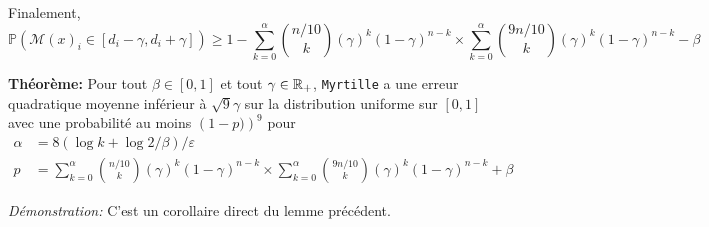 Finalement,
\[
    \mathbb P\left(  \mathcal M(x)_i \in [d_i - \gamma, d_i + \gamma] \right) \geq 1 - \sum_{k = 0}^{\alpha} \binom{n/10}{k}\left( \gamma \right)^k (1 - \gamma)^{n-k} \times \sum_{k = 0}^{\alpha} \binom{9n/10}{k}\left( \gamma \right)^k (1 - \gamma)^{n-k} - \beta  
\]

\vspace*{5pt}
\textbf{Théorème: } Pour tout \(\beta \in [0,1]\) et tout \(\gamma \in \mathbb{R}_+\), \texttt{Myrtille} a une erreur quadratique moyenne inférieur à \(\sqrt{9}\gamma\) sur la distribution uniforme sur \([0,1]\) avec une probabilité au moins \(\left( 1 - p) \right)^9\) pour 
\begin{align*}
    \alpha & = 8\left( \log k + \log 2/\beta \right)/\varepsilon\\
    p & = \sum_{k = 0}^{\alpha} \binom{n/10}{k}\left( \gamma \right)^k (1 - \gamma)^{n-k} \times \sum_{k = 0}^{\alpha} \binom{9n/10}{k}\left( \gamma \right)^k (1 - \gamma)^{n-k} + \beta
\end{align*}

\textit{Démonstration:} C'est un corollaire direct du lemme précédent. 


